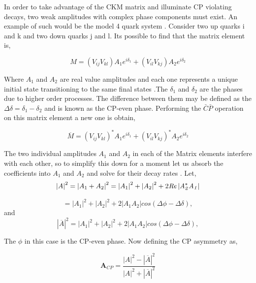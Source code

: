 In order to take advantage of the CKM matrix and illuminate CP violating decays,  two weak amplitudes with complex phase components must exist. An example of such would be the model 4 quark system \cite{CKM4}. Consider two up quarks i and k and two down quarks j and l. Its possible to find that the matrix element is,

\begin{equation}\label{mat4}
M=(V_{ij} V_{kl}) A_1 e^{i \delta_{1}} +(V_{il} V_{kj}) A_2 e^{i\delta_{2}}
\end{equation}

Where $A_1$ and $A_2$ are real value amplitudes and each one represents a unique initial state transitioning to the same final states .The $\delta_1$ and $\delta_2$ are the phases due to higher order processes. The difference between them may be defined as the $\Delta\delta = \delta_1 - \delta_2$ and is known as the CP-even phase. Performing the $\bar{C}\bar{P}$ operation on this matrix element a new one is obtain,

\begin{equation}\label{mat5}
\overline{M}=(V_{ij} V_{kl})^* A_1 e^{i\delta_1} +(V_{il} V_{kj})^* A_2 e^{i\delta_2}
\end{equation}

The two individual amplitudes $A_1$ and $A_2$ in each of the Matrix elements interfere with each other, so to simplify this down for a moment let us absorb the coefficients into $A_1$ and $A_2$ and solve for their decay rates \cite{CKM6}. 
Let,
\begin{equation}\label{amp1}
 \left|A\right|^2 = \left| A_1 +A_2 \right|^2 =\left|  A_1 \right|^2+ \left| A_2 \right|^2 +2\it{R} e\left| A^*_2 A_1 \right| 
\end{equation}

\begin{equation}\label{amp2}
 =\left| A_1 \right|^2 + \left| A_2 \right|^2 +2\left|A_1 A_2 \right| cos(\Delta \phi - \Delta\delta),
\end{equation}
 and
\begin{equation}\label{amp3}
\left| \overline{A}\right|^2 =\left| A_1 \right|^2+ \left| A_2 \right|^2 +2\left| A_1 A_2 \right| cos(\Delta \phi - \Delta\delta),
\end{equation}


The $\phi$ in this case is the CP-even phase. Now defining the CP asymmetry as,

\begin{equation}\label{As1}
\mathbf{A}_{CP} = \frac{\left|A\right|^2-\left|\overline{A}\right|^2}{\left|A\right|^2+\left|\overline{A}\right|^2}
\end{equation}

